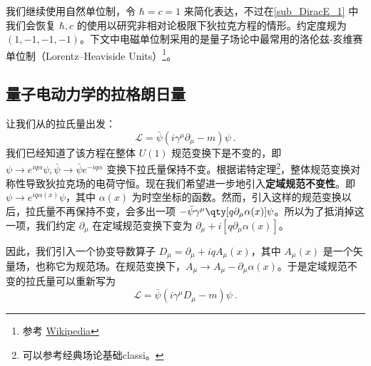 

我们继续使用自然单位制，令 $\hbar=c=1$ 来简化表达，不过在\autoref{sub_DiracE_1} 中我们会恢复 $\hbar,c$ 的使用以研究非相对论极限下狄拉克方程的情形。约定度规为 $(1,-1,-1,-1)$。下文中电磁单位制采用的是量子场论中最常用的洛伦兹-亥维赛单位制（Lorentz–Heaviside Units）\footnote{参考 \href{https://en.wikipedia.org/wiki/Heaviside\%E2\%80\%93Lorentz_units}{Wikipedia}}。

\subsection{量子电动力学的拉格朗日量}
让我们从的拉氏量出发：
\begin{equation}
\mathcal{L}=\bar\psi (i\gamma^\mu \partial_\mu - m)\psi ~.
\end{equation}
我们已经知道了该方程在整体 $U(1)$ 规范变换下是不变的，即 $\psi\rightarrow e^{iq\alpha}\psi,\bar\psi \rightarrow \bar\psi e^{-iq\alpha}$ 变换下拉氏量保持不变。根据诺特定理\footnote{可以参考经典场论基础{classi}。}，整体规范变换对称性导致狄拉克场的电荷守恒。现在我们希望进一步地引入\textbf{定域规范不变性}。即 $\psi\rightarrow e^{iq\alpha(x)}\psi $，其中 $\alpha(x)$ 为时空坐标的函数。然而，引入这样的规范变换以后，拉氏量不再保持不变，会多出一项 $-\bar\psi \gamma^\mu \qty[q\partial_\mu \alpha(x)]\psi$。所以为了抵消掉这一项，我们约定 $\partial_\mu$ 在定域规范变换下变为 $\partial_\mu+i[q\partial_\mu \alpha(x)]$。

因此，我们引入一个协变导数算子 $D_\mu = \partial_\mu +iqA_\mu(x)$，其中 $A_\mu(x)$ 是一个矢量场，也称它为规范场。在规范变换下，$A_\mu\rightarrow A_\mu - \partial_\mu \alpha(x)$。于是定域规范不变的拉氏量可以重新写为
\begin{equation}
\mathcal{L}=\bar\psi(i\gamma^\mu D_\mu-m)\psi ~.
\end{equation}


